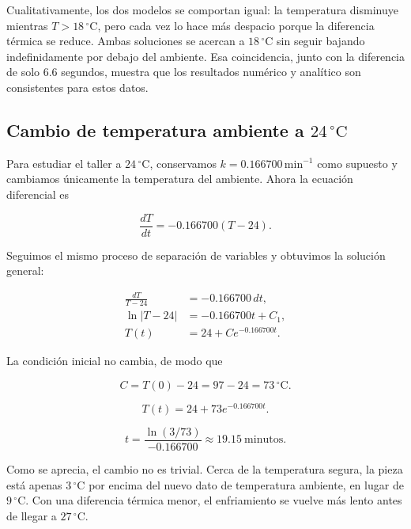 \documentclass[11pt,onecolumn,letterpaper]{article}
\begin{document}
Cualitativamente, los dos modelos se comportan igual: la temperatura disminuye mientras \(T>18\,^{\circ}\mathrm{C}\), pero cada vez lo hace más despacio porque la diferencia térmica se reduce. Ambas soluciones se acercan a \(18\,^{\circ}\mathrm{C}\) sin seguir bajando indefinidamente por debajo del ambiente. Esa coincidencia, junto con la diferencia de solo 6.6 segundos, muestra que los resultados numérico y analítico son consistentes para estos datos.

\subsection{Cambio de temperatura ambiente a \texorpdfstring{\(24\,^{\circ}\mathrm{C}\)}{24 grados Celsius}}

Para estudiar el taller a \(24\,^{\circ}\mathrm{C}\), conservamos \(k=0.166700\,\mathrm{min}^{-1}\) como supuesto y cambiamos únicamente la temperatura del ambiente. Ahora la ecuación diferencial es

\begin{equation*}
    \frac{dT}{dt}=-0.166700(T-24).
\end{equation*}

Seguimos el mismo proceso de separación de variables y obtuvimos la solución general:

\begin{align*}
    \frac{dT}{T-24} &= -0.166700\,dt, \\
    \ln|T-24| &= -0.166700t+C_1, \\
    T(t) &= 24+Ce^{-0.166700t}.
\end{align*}

La condición inicial no cambia, de modo que

\begin{equation*}
    C=T(0)-24=97-24=73\,^{\circ}\mathrm{C}.
\end{equation*}

\begin{equation}
    \boxed{T(t)=24+73e^{-0.166700t}}.
    \label{eq:modelo-24}
\end{equation}

\begin{equation*}
    t=\frac{\ln(3/73)}{-0.166700}\approx19.15\ \text{minutos}.
\end{equation*}

Como se aprecia, el cambio no es trivial. Cerca de la temperatura segura, la pieza está apenas \(3\,^{\circ}\mathrm{C}\) por encima del nuevo dato de temperatura ambiente, en lugar de \(9\,^{\circ}\mathrm{C}\). Con una diferencia térmica menor, el enfriamiento se vuelve más lento antes de llegar a \(27\,^{\circ}\mathrm{C}\).
\end{document}
